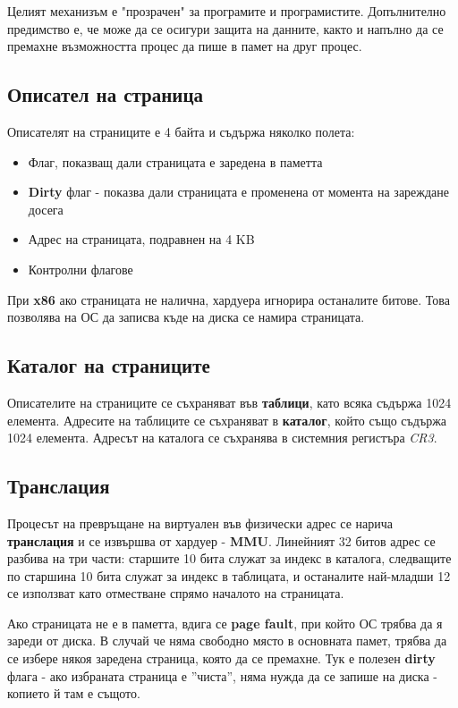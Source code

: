 \documentclass[fleqn,12pt]{article}
\begin{document}
Целият механизъм е "прозрачен" за програмите и програмистите. Допълнително предимство е, че може да се осигури защита на данните,
както и напълно да се премахне възможността процес да пише в памет на друг процес.

\subsection{Описател на страница}
Описателят на страниците е 4 байта и съдържа няколко полета:
\begin{itemize}
    \item Флаг, показващ дали страницата е заредена в паметта
    \item \textbf{Dirty} флаг - показва дали страницата е променена от момента на зареждане досега
    \item Адрес на страницата, подравнен на 4 KB
    \item Контролни флагове
\end{itemize}

При \textbf{x86} ако страницата не налична, хардуера игнорира останалите битове. Това позволява на ОС да записва
къде на диска се намира страницата.

\subsection{Каталог на страниците}
Описателите на страниците се съхраняват във \textbf{таблици}, като всяка съдържа 1024 елемента. 
Адресите на таблиците се съхраняват в \textbf{каталог}, който също съдържа 1024 елемента.
Адресът на каталога се съхранява в системния регистъра \textit{CR3}.

\subsection{Транслация}
Процесът на превръщане на виртуален във физически адрес се нарича \textbf{транслация} и се извършва от хардуер - \textbf{MMU}.
Линейният 32 битов адрес се разбива на три части: старшите 10 бита служат за индекс в каталога, следващите по старшина
10 бита служат за индекс в таблицата, и останалите най-младши 12 се използват като отместване спрямо началото на страницата.

Ако страницата не е в паметта, вдига се \textbf{page fault}, при който ОС трябва да я зареди от диска. В случай че няма свободно място
в основната памет, трябва да се избере някоя заредена страница, която да се премахне. Тук е полезен 
\textbf{dirty} флага - ако избраната страница е ''чиста'', няма нужда да се запише на диска - копието й там е същото.
\end{document}
